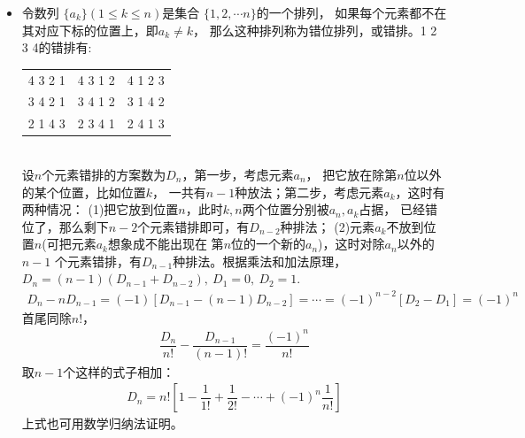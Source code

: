 \begin{itemize}[leftmargin=\inteval{\myitemleftmargin}pt,itemsep=
   \inteval{\myitemitempsep}pt,topsep=\inteval{\myitemtopsep}pt]
\item 令数列 $ \{ a_k \} (1\leq k \leq n) $是集合
$ \{ 1,2,\cdots n \} $的一个排列，
如果每个元素都不在其对应下标的位置上，即$ a_k\neq k $，
那么这种排列称为错位排列，或错排。1 2 3 4的错排有:
\begin{table}[h]
    \centering
    \begin{tabular}{ccc}
        4 3 2 1 & 4 3 1 2 & 4 1 2 3 \\
        3 4 2 1 & 3 4 1 2 & 3 1 4 2 \\
        2 1 4 3 & 2 3 4 1 & 2 4 1 3 
    \end{tabular}
\end{table} \\
设$ n $个元素错排的方案数为$ D_n $，第一步，考虑元素$ a_n $，
把它放在除第$ n $位以外的某个位置，比如位置$ k $，
一共有$ n-1 $种放法；第二步，考虑元素$ a_k $，这时有两种情况：
(1)把它放到位置$ n $，此时$ k,n $两个位置分别被$ a_n,a_k $占据，
已经错位了，那么剩下$ n-2 $个元素错排即可，有$ D_{n-2} $种排法；
(2)元素$ a_k $不放到位置$ n $(可把元素$ a_k $想象成不能出现在
第$ n $位的一个新的$ a_n $)，这时对除$ a_n $以外的$ n-1 $
个元素错排，有$ D_{n-1} $种排法。根据乘法和加法原理，
$ D_n=(n-1)(D_{n-1}+D_{n-2}),\ D_1=0,\ D_2=1. $
\begin{gather*}
    D_n-nD_{n-1}=(-1)[D_{n-1}-(n-1)D_{n-2}]=\cdots =(-1)^{n-2}[D_2-D_1]=(-1)^n 
\end{gather*}
首尾同除$ n! $，
\begin{gather*}
    \dfrac{D_n}{n!}-\dfrac{D_{n-1}}{(n-1)!}=\dfrac{(-1)^n}{n!} 
\end{gather*}
取$ n-1 $个这样的式子相加：
\begin{align}\label{错排通项公式}
    D_n=n!\left[ 1-\dfrac{1}{1!}+\dfrac{1}{2!}-\cdots 
    +(-1)^n\dfrac{1}{n!}\right] 
\end{align}
上式也可用数学归纳法证明。



\end{itemize}
